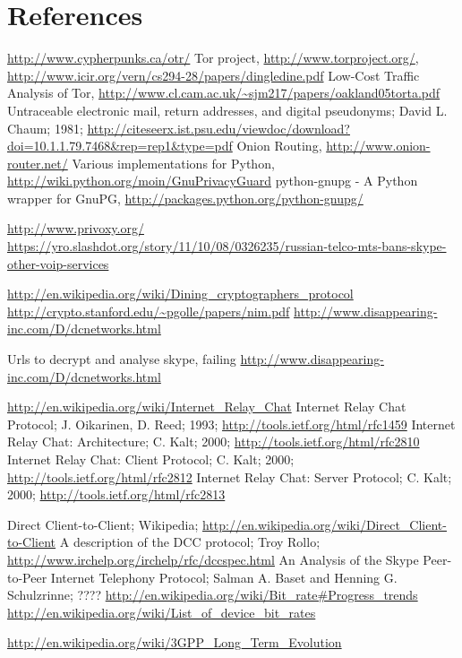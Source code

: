 \section{References}
\begin{thebibliography}{666}
 \url{http://www.cypherpunks.ca/otr/}
 Tor project, \url{http://www.torproject.org/},
    \url{http://www.icir.org/vern/cs294-28/papers/dingledine.pdf}
 Low-Cost Traffic Analysis of Tor,
    \url{http://www.cl.cam.ac.uk/~sjm217/papers/oakland05torta.pdf}
 Untraceable electronic mail, return addresses, and digital pseudonyms;
    David L. Chaum; 1981;
    \url{http://citeseerx.ist.psu.edu/viewdoc/download?doi=10.1.1.79.7468&rep=rep1&type=pdf}
 Onion Routing, \url{http://www.onion-router.net/}
 Various implementations for Python,
    \url{http://wiki.python.org/moin/GnuPrivacyGuard}
 python-gnupg - A Python wrapper for GnuPG,
    \url{http://packages.python.org/python-gnupg/}

 \url{http://www.privoxy.org/}
\url{https://yro.slashdot.org/story/11/10/08/0326235/russian-telco-mts-bans-skype-other-voip-services}

\url{http://en.wikipedia.org/wiki/Dining_cryptographers_protocol}
\url{http://crypto.stanford.edu/~pgolle/papers/nim.pdf}
\url{http://www.disappearing-inc.com/D/dcnetworks.html}

 Urls to decrypt and analyse skype, failing
\url{http://www.disappearing-inc.com/D/dcnetworks.html}

 \url{http://en.wikipedia.org/wiki/Internet_Relay_Chat}
 Internet Relay Chat Protocol; J. Oikarinen, D. Reed; 1993;
    \url{http://tools.ietf.org/html/rfc1459}
 Internet Relay Chat: Architecture; C. Kalt; 2000;
    \url{http://tools.ietf.org/html/rfc2810}
 Internet Relay Chat: Client Protocol; C. Kalt; 2000;
    \url{http://tools.ietf.org/html/rfc2812}
 Internet Relay Chat: Server Protocol; C. Kalt; 2000;
    \url{http://tools.ietf.org/html/rfc2813}

 Direct Client-to-Client; Wikipedia;
    \url{http://en.wikipedia.org/wiki/Direct_Client-to-Client}
 A description of the DCC protocol; Troy Rollo;
    \url{http://www.irchelp.org/irchelp/rfc/dccspec.html}
 An Analysis of the Skype Peer-to-Peer Internet
Telephony Protocol;
Salman A. Baset and Henning G. Schulzrinne;
????
 \url{http://en.wikipedia.org/wiki/Bit_rate#Progress_trends}
 \url{http://en.wikipedia.org/wiki/List_of_device_bit_rates}

 \url{http://en.wikipedia.org/wiki/3GPP_Long_Term_Evolution}

\end{thebibliography}

